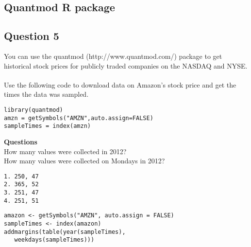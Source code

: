 \documentclass[]{article}
\begin{document}
\subsection*{Quantmod R package}
\newpage
\subsection*{Question 5}
You can use the quantmod (http://www.quantmod.com/) package to get historical stock prices for publicly traded companies on the NASDAQ and NYSE. \\
\\
Use the following code to download data on Amazon's stock price and get the times the data was sampled.
\begin{framed}
\begin{verbatim}
library(quantmod)
amzn = getSymbols("AMZN",auto.assign=FALSE)
sampleTimes = index(amzn) 
\end{verbatim}
\end{framed}
\noindent \textbf{Questions}\\
\noindent How many values were collected in 2012?\\ How many values were collected on Mondays in 2012?
\begin{verbatim}
1. 250, 47
2. 365, 52
3. 251, 47
4. 251, 51
\end{verbatim}


\begin{framed}
\begin{verbatim}
amazon <- getSymbols("AMZN", auto.assign = FALSE)
sampleTimes <- index(amazon) 
addmargins(table(year(sampleTimes),      
   weekdays(sampleTimes)))
\end{verbatim}
\end{framed}
\end{document}
